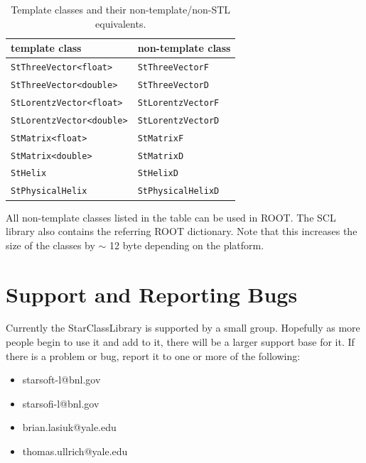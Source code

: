 \documentclass[twoside]{article}
\newcommand{\name}[1]{\textsf{#1}}%
\begin{document}
\begin{description}
\begin{table}[htb]
    \begin{center}
    \begin{tabular}{|l|l|}
        \hline
        \textbf{template class} & \textbf{non-template class} \\ \hline
        \verb+StThreeVector<float>+ & \verb+StThreeVectorF+ \\ \hline
        \verb+StThreeVector<double>+ & \verb+StThreeVectorD+ \\ \hline
        \verb+StLorentzVector<float>+ & \verb+StLorentzVectorF+ \\ \hline
        \verb+StLorentzVector<double>+ & \verb+StLorentzVectorD+ \\ \hline
        \verb+StMatrix<float>+ & \verb+StMatrixF+ \\ \hline
        \verb+StMatrix<double>+ & \verb+StMatrixD+ \\ \hline
        \verb+StHelix+ & \verb+StHelixD+ \\ \hline
        \verb+StPhysicalHelix+ & \verb+StPhysicalHelixD+ \\ \hline
    \end{tabular}            
    \caption{Template classes and their non-template/non-STL equivalents.}
    \label{tab:templates}
    \end{center}
\end{table}

All non-template classes listed in the table can be used in ROOT. The SCL library also
contains the referring ROOT dictionary. Note that this increases the size of the classes
by $\sim$ 12 byte depending on the platform.

\section{Support and Reporting Bugs} 
Currently the \name{StarClassLibrary} is supported by a small group.  Hopefully
as more people begin to use it and add to it, there will be a larger
support base for it.  If there is a problem or bug, report it to
one or more of the following:
\begin{itemize}
  \item starsoft-l@bnl.gov
  \item starsofi-l@bnl.gov
  \item brian.lasiuk@yale.edu
  \item thomas.ullrich@yale.edu
\end{itemize}

\clearpage


\end{description}
\end{document}
